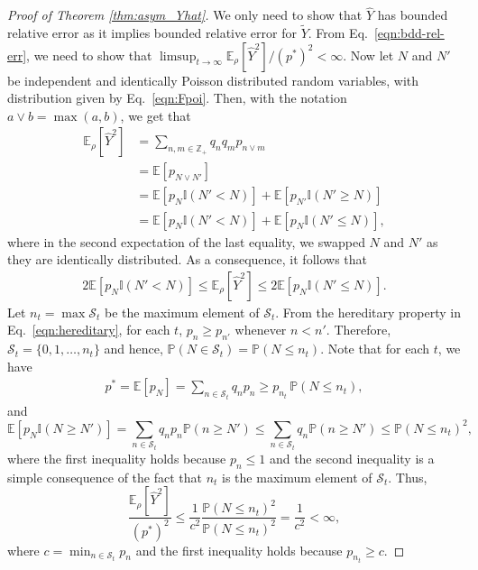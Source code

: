 \documentclass[pdflatex, sn-mathphys-ay]{sn-jnl}%
\newcommand{\intg}{\mathbb{Z}}
\newcommand{\ind}{\mathbb{I}}
\newcommand{\mc}{\mathcal}
\newcommand{\pp}{\mathbb{P}}
\newcommand{\ee}{\mathbb{E}}
\newcommand{\lt}{\left}
\newcommand{\rt}{\right}
\newcommand{\wt}{\widetilde}
\newcommand{\wh}{\widehat}
\theoremstyle{thmstyleone}%
\theoremstyle{thmstyletwo}%
\theoremstyle{thmstylethree}%
\begin{document}
\begin{proof}[Proof of Theorem \ref{thm:asym_Yhat}]
We only need to show that $\wh Y$ has bounded relative error as it implies bounded relative error for $\wt Y$.  From Eq.~\eqref{eqn:bdd-rel-err}, we need to show that
$\limsup_{t \rightarrow \infty} \ee_\rho[\wh Y^2]/(p^*)^2 < \infty$. 
Now let $N$ and $N'$ be independent and identically Poisson distributed random variables, with distribution given by Eq.~\eqref{eqn:Fpoi}. Then, with the notation $a \vee b = \max(a, b)$, we get that
\begin{align*}
\ee_\rho[\wh Y^2] &= \sum_{n, m \in \intg_+} q_n q_m p_{n \vee m}\\
                &= \ee\lt[p_{N\vee N'}\rt]\\
                &= \ee\lt[p_{N} \ind(N' < N)\rt] + \ee\lt[p_{N'} \ind(N' \geq N)\rt]\\
                &= \ee\lt[p_{N} \ind(N' < N)\rt] + \ee\lt[p_{N} \ind(N' \leq N)\rt],
\end{align*} 
where in the second expectation of the last equality, we swapped $N$ and $N'$ as they are identically distributed. As a consequence, it follows that
\begin{align}
2\ee\lt[p_{N} \ind(N' < N)\rt] \leq \ee_\rho[\wh Y^2]\leq 2\ee\lt[p_{N} \ind(N' \leq N)\rt]. \label{eqn:ubd_lbd_yhat}
\end{align}
Let $n_t = \max \mc{S}_t$ be the maximum element of $\mc S_t$. 
From the hereditary property in Eq.~\eqref{eqn:hereditary}, for each $t$, $p_n \geq p_{n'}$ whenever $n < n'$. Therefore, $\mc{S}_t = \{0, 1, \dots, n_t\}$ and hence, $\pp(N \in \mc{S}_t) = \pp(N \leq n_t)$.
Note that for each $t$, we have
\begin{align}
\label{eqn:lbd_p*}
p^* = \ee[p_N] = \sum_{n \in \mc{S}_t} q_n p_n \geq p_{n_t} \, \pp(N \leq n_t),
\end{align}
and
\[
\ee\lt[p_{N} \ind(N \geq N')\rt] = \sum_{n \in \mc{S}_t} q_n p_n \pp(n \geq N') \leq \sum_{n \in \mc{S}_t} q_n \pp(n \geq N') \leq \pp(N \leq n_t)^2,
\]
where the first inequality holds because $p_n \leq 1$ and the second inequality is a simple consequence of the fact that $n_t$ is the maximum element of $\mc{S}_t$. Thus, 
\[
\frac{\ee_\rho[\wh Y^2]}{(p^*)^2} \leq \frac{1}{c^2} \frac{\pp(N \leq n_t)^2 }{\pp(N \leq n_t)^2} = \frac{1}{c^2} < \infty,
\]
where $c = \min_{n \in \mc{S}_t} p_n$ and the first inequality holds because $p_{n_t} \geq c$.   
\end{proof}
\end{document}
